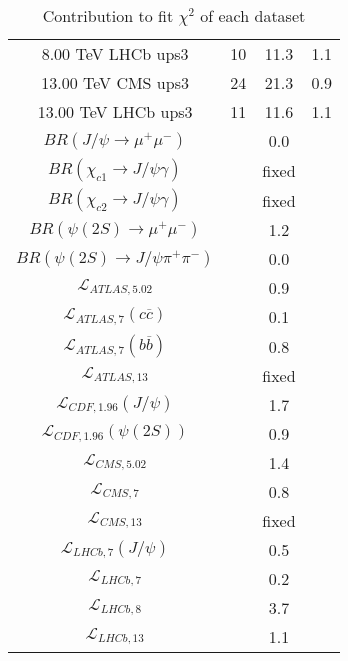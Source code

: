 \begin{table}[h!]
\begin{tabular}{c|c|c|c}
8.00 TeV LHCb ups3 & 10 & 11.3 & 1.1 \\
13.00 TeV CMS ups3 & 24 & 21.3 & 0.9 \\
13.00 TeV LHCb ups3 & 11 & 11.6 & 1.1 \\
\hline
$BR(J/\psi\rightarrow\mu^+\mu^-)$ &  & 0.0 &  \\
$BR(\chi_{c1}\rightarrow J/\psi\gamma)$ &  & fixed & \\
$BR(\chi_{c2}\rightarrow J/\psi\gamma)$ &  & fixed & \\
$BR(\psi(2S)\rightarrow\mu^+\mu^-)$ &  & 1.2 &  \\
$BR(\psi(2S)\rightarrow J/\psi\pi^+\pi^-)$ &  & 0.0 &  \\
$\mathcal L_{ATLAS,5.02}$ &  & 0.9 &  \\
$\mathcal L_{ATLAS,7}(c\overline c)$ &  & 0.1 &  \\
$\mathcal L_{ATLAS,7}(b\overline b)$ &  & 0.8 &  \\
$\mathcal L_{ATLAS,13}$ &  & fixed & \\
$\mathcal L_{CDF,1.96}(J/\psi)$ &  & 1.7 &  \\
$\mathcal L_{CDF,1.96}(\psi(2S))$ &  & 0.9 &  \\
$\mathcal L_{CMS,5.02}$ &  & 1.4 &  \\
$\mathcal L_{CMS,7}$ &  & 0.8 &  \\
$\mathcal L_{CMS,13}$ &  & fixed & \\
$\mathcal L_{LHCb,7}(J/\psi)$ &  & 0.5 &  \\
$\mathcal L_{LHCb,7}$ &  & 0.2 &  \\
$\mathcal L_{LHCb,8}$ &  & 3.7 &  \\
$\mathcal L_{LHCb,13}$ &  & 1.1 &  \\
\end{tabular}
\caption{Contribution to fit $\chi^2$ of each dataset}
\end{table}

